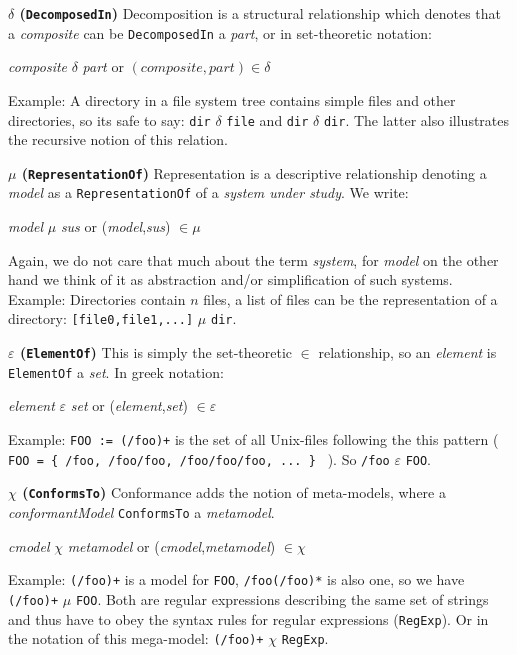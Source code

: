 \documentclass[runningheads,a4paper]{llncs}
\begin{document}
\textbf{$\delta$ (\texttt{DecomposedIn})}
Decomposition is a structural relationship which denotes that a \textit{composite} can be \texttt{DecomposedIn} a \textit{part}, or in set-theoretic notation: 
\begin{center}
\textit{composite} $\delta$ \textit{part} or $(composite, part) \in \delta$
\end{center}
Example: 
A directory in a file system tree contains simple files and other directories, so its safe to say: 
\texttt{dir} $\delta$ \texttt{file} and \texttt{dir} $\delta$ \texttt{dir}. 
The latter also illustrates the recursive notion of this relation.

\textbf{$\mu$ (\texttt{RepresentationOf})}
Representation is a descriptive relationship denoting a \textit{model} as a \texttt{RepresentationOf} of a \textit{system under study}. 
We write:
\begin{center}
\textit{model} $\mu$ \textit{sus}
or 
(\textit{model},\textit{sus}) $\in\mu$
\end{center}
Again, we do not care that much about the term \textit{system}, for \textit{model} on the other hand we think of it as abstraction and/or simplification of such systems.
Example: 
Directories contain $n$ files, a list of files can be the representation of a directory: \texttt{[file0,file1,...]} $\mu$ \texttt{dir}.

\textbf{$\varepsilon$ (\texttt{ElementOf})}
This is simply the set-theoretic $\in$ relationship, so an \textit{element} is \texttt{ElementOf} a \textit{set}. In greek notation:
\begin{center}
\textit{element} $\varepsilon$ \textit{set}
or 
(\textit{element},\textit{set}) $\in\varepsilon$
\end{center}
Example: 
\texttt{FOO := (/foo)+} is the set of all Unix-files following the this pattern ( \texttt{FOO = \{ /foo, /foo/foo, /foo/foo/foo, ... \} } ).
So \texttt{/foo} $\varepsilon$ \texttt{FOO}.

\textbf{$\chi$ (\texttt{ConformsTo})}
Conformance adds the notion of meta-models, where a \textit{conformantModel} \texttt{ConformsTo} a \textit{metamodel}.
\begin{center}
\textit{cmodel} $\chi$ \textit{metamodel}
or 
(\textit{cmodel},\textit{metamodel}) $\in\chi$
\end{center}
Example: 
\texttt{(/foo)+} is a model for \texttt{FOO}, \texttt{/foo(/foo)*} is also one, so we have \texttt{(/foo)+} $\mu$ \texttt{FOO}. 
Both are regular expressions describing the same set of strings and thus have to obey the syntax rules for regular expressions (\texttt{RegExp}).
Or in the notation of this mega-model: \texttt{(/foo)+} $\chi$ \texttt{RegExp}.
\end{document}

